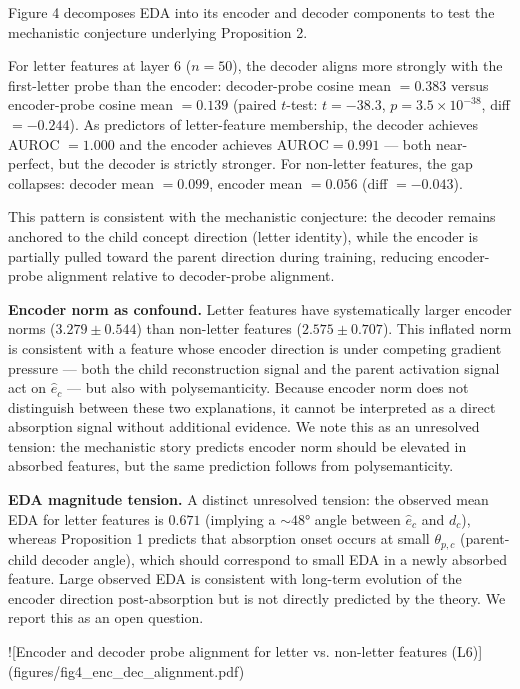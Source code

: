 \documentclass{article}
\begin{document}
Figure 4 decomposes EDA into its encoder and decoder components to test the mechanistic
conjecture underlying Proposition 2.

For letter features at layer 6 ($n = 50$), the decoder aligns more strongly with the
first-letter probe than the encoder:
decoder-probe cosine mean $= 0.383$ versus encoder-probe cosine mean $= 0.139$
(paired $t$-test: $t = -38.3$, $p = 3.5 \times 10^{-38}$, diff $= -0.244$).
As predictors of letter-feature membership, the decoder achieves AUROC $= 1.000$ and the
encoder achieves $\text{AUROC} = 0.991$ — both near-perfect, but the decoder is strictly
stronger.
For non-letter features, the gap collapses: decoder mean $= 0.099$, encoder mean $= 0.056$
(diff $= -0.043$).

This pattern is consistent with the mechanistic conjecture: the decoder remains anchored to
the child concept direction (letter identity), while the encoder is partially pulled toward the
parent direction during training, reducing encoder-probe alignment relative to decoder-probe
alignment.

\textbf{Encoder norm as confound.} Letter features have systematically larger encoder norms
($3.279 \pm 0.544$) than non-letter features ($2.575 \pm 0.707$).
This inflated norm is consistent with a feature whose encoder direction is under competing
gradient pressure — both the child reconstruction signal and the parent activation signal
act on $\hat{e}_c$ — but also with polysemanticity.
Because encoder norm does not distinguish between these two explanations, it cannot be
interpreted as a direct absorption signal without additional evidence.
We note this as an unresolved tension: the mechanistic story predicts encoder norm should
be elevated in absorbed features, but the same prediction follows from polysemanticity.

\textbf{EDA magnitude tension.} A distinct unresolved tension: the observed mean EDA for letter
features is $0.671$ (implying a $\sim 48°$ angle between $\hat{e}_c$ and $d_c$),
whereas Proposition 1 predicts that absorption onset occurs at small $\theta_{p,c}$
(parent-child decoder angle), which should correspond to small EDA in a newly absorbed feature.
Large observed EDA is consistent with long-term evolution of the encoder direction post-absorption
but is not directly predicted by the theory. We report this as an open question.

![Encoder and decoder probe alignment for letter vs. non-letter features (L6)](figures/fig4_enc_dec_alignment.pdf)
\end{document}
